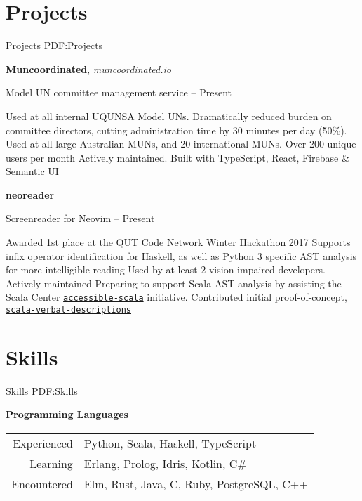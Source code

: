\documentclass[a4paper,10pt,oneside]{article}
\begin{document}
\begin{body}
\section
{Projects}
{Projects}
{PDF:Projects}

\textbf{Muncoordinated}, \href{https://muncoordinated.io}{\textit{muncoordinated.io}}
\par Model UN committee management service\hfill {} -- Present
\begin{detail}
	\BulletItem Used at all internal UQUNSA Model UNs. Dramatically reduced burden on committee directors, cutting administration time by 30 minutes per day (50\%). Used at all large Australian MUNs, and 20 international MUNs. Over 200 unique users per month
	\BulletItem Actively maintained. Built with TypeScript, React, Firebase \& Semantic UI
\end{detail}

\EntryGap

\href{https://github.com/MaxwellBo/neoreader}{\textbf{neoreader}} 
\par Screenreader for Neovim\hfill {} -- Present
\begin{detail}
	\BulletItem Awarded 1st place at the QUT Code Network Winter Hackathon 2017
	\BulletItem Supports infix operator identification for Haskell, as well as Python 3 specific AST analysis for more intelligible reading
	\BulletItem  Used by at least 2 vision impaired developers. Actively maintained
	\BulletItem Preparing to support Scala AST analysis by assisting the Scala Center \href{https://github.com/scalacenter/accessible-scala}{\texttt{accessible-scala}} initiative. Contributed initial proof-of-concept, \href{https://github.com/MaxwellBo/scala-verbal-descriptions}{\texttt{scala-verbal-descriptions}}
\end{detail}


\section
{Skills}
{Skills}
{PDF:Skills}

\textbf{Programming Languages}
\par
\begin{tabular}{rl}
\par Experienced & Python, Scala, Haskell, TypeScript\\
\par Learning & Erlang, Prolog, Idris, Kotlin, C\#\\
\par Encountered & Elm, Rust, Java, C, Ruby, PostgreSQL, C++
\end{tabular}


\end{body}
\end{document}
